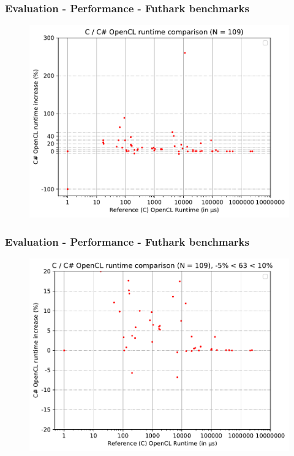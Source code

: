 \documentclass[10pt, compress, usenames, dvipsnames]{beamer}
\begin{document}
\begin{frame}[fragile]
  \frametitle{Evaluation - Performance - Futhark benchmarks}
  \begin{figure}
  \includegraphics[scale=0.7]{./images/plot}
  \end{figure}
\end{frame}
\begin{frame}[fragile]

  \frametitle{Evaluation - Performance - Futhark benchmarks}
  \begin{figure}
  \includegraphics[scale=0.7]{./images/plot2}
  \end{figure}
\end{frame}
\end{document}
